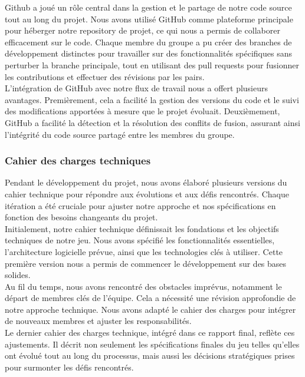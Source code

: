 Github a joué un rôle central dans la gestion et le partage de notre code source tout au long du projet. 
Nous avons utilisé GitHub comme plateforme principale pour héberger notre repository de projet, ce qui nous a permis de collaborer efficacement sur le code. 
Chaque membre du groupe a pu créer des branches de développement distinctes pour travailler sur des fonctionnalités spécifiques sans perturber la branche principale, tout en utilisant des pull requests pour fusionner les contributions et effectuer des révisions par les pairs.
\\

L'intégration de GitHub avec notre flux de travail nous a offert plusieurs avantages. 
Premièrement, cela a facilité la gestion des versions du code et le suivi des modifications apportées à mesure que le projet évoluait. 
Deuxièmement, GitHub a facilité la détection et la résolution des conflits de fusion, assurant ainsi l'intégrité du code source partagé entre les membres du groupe. 
\\

\subsubsection{Cahier des charges techniques}
Pendant le développement du projet, nous avons élaboré plusieurs versions du cahier technique pour répondre aux évolutions et aux défis rencontrés. Chaque itération a été cruciale pour ajuster notre approche et nos spécifications en fonction des besoins changeants du projet. 
\\

Initialement, notre cahier technique définissait les fondations et les objectifs techniques de notre jeu. Nous avons spécifié les fonctionnalités essentielles, l'architecture logicielle prévue, ainsi que les technologies clés à utiliser. Cette première version nous a permis de commencer le développement sur des bases solides. 
\\

Au fil du temps, nous avons rencontré des obstacles imprévus, notamment le départ de membres clés de l'équipe. Cela a nécessité une révision approfondie de notre approche technique. Nous avons adapté le cahier des charges pour intégrer de nouveaux membres et ajuster les responsabilités. 
\\

Le dernier cahier des charges technique, intégré dans ce rapport final, reflète ces ajustements. Il décrit non seulement les spécifications finales du jeu telles qu'elles ont évolué tout au long du processus, mais aussi les décisions stratégiques prises pour surmonter les défis rencontrés. 
